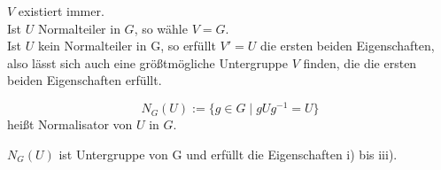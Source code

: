 \documentclass[a4paper]{article}
\begin{document}
    \begin{bemerkung}
        $V$ existiert immer. \\
        Ist $U$ Normalteiler in $G$, so wähle $V = G$. \\
        Ist $U$ kein Normalteiler in G, so erfüllt $V' = U$ die ersten beiden Eigenschaften, also lässt sich auch eine größtmögliche Untergruppe $V$ finden, die die ersten beiden Eigenschaften erfüllt.
    \end{bemerkung}

    \begin{definition}
        \[
            N_G(U) := \{g \in G  \mid g U g^{-1} = U\} 
        \] 
        heißt Normalisator von $U$ in $G$.
    \end{definition}

    \begin{satz}
        $N_G(U)$ ist Untergruppe von G und erfüllt die Eigenschaften i) bis iii).
    \end{satz}

    \vspace{2mm}
\end{document}
